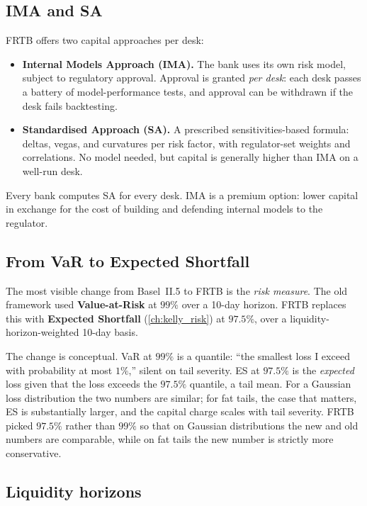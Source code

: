 \subsection{IMA and SA}

FRTB offers two capital approaches per desk:

\begin{itemize}
  \item \textbf{Internal Models Approach (IMA).}  The bank uses
    its own risk model, subject to regulatory approval.
    Approval is granted \emph{per desk}: each desk passes a
    battery of model-performance tests, and approval can be
    withdrawn if the desk fails backtesting.
  \item \textbf{Standardised Approach (SA).}  A prescribed
    sensitivities-based formula: deltas, vegas, and curvatures
    per risk factor, with regulator-set weights and
    correlations.  No model needed, but capital is generally
    higher than IMA on a well-run desk.
\end{itemize}

Every bank computes SA for every desk.  IMA is a premium option:
lower capital in exchange for the cost of building and defending
internal models to the regulator.

\subsection{From VaR to Expected Shortfall}

The most visible change from Basel~II.5 to FRTB is the
\emph{risk measure}.  The old framework used \textbf{Value-at-Risk}
at $99\%$ over a 10-day horizon.  FRTB replaces this with
\textbf{Expected Shortfall} (\cref{ch:kelly_risk}) at $97.5\%$,
over a liquidity-horizon-weighted 10-day basis.

The change is conceptual.  VaR at $99\%$ is a quantile: ``the
smallest loss I exceed with probability at most $1\%$,'' silent
on tail severity.  ES at $97.5\%$ is the \emph{expected} loss
given that the loss exceeds the $97.5\%$ quantile, a tail
mean.  For a Gaussian loss distribution the two numbers are
similar; for fat tails, the case that matters, ES is
substantially larger, and the capital charge scales with tail
severity.  FRTB picked $97.5\%$ rather than $99\%$ so that on
Gaussian distributions the new and old numbers are comparable,
while on fat tails the new number is strictly more conservative.

\subsection{Liquidity horizons}

